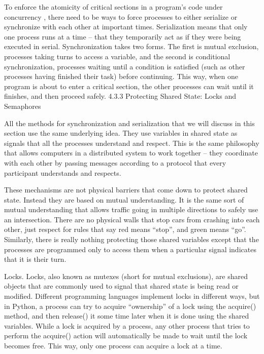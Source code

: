 \documentclass[letterpaper,10pt,dvipdfmx]{sphinxmanual}
\begin{document}
To enforce the atomicity of critical sections in a program's code under concurrency , there need to be ways to force processes to either serialize or synchronize with each other at important times. Serialization means that only one process runs at a time -- that they temporarily act as if they were being executed in serial. Synchronization takes two forms. The first is mutual exclusion, processes taking turns to access a variable, and the second is conditional synchronization, processes waiting until a condition is satisfied (such as other processes having finished their task) before continuing. This way, when one program is about to enter a critical section, the other processes can wait until it finishes, and then proceed safely.
4.3.3   Protecting Shared State: Locks and Semaphores

All the methods for synchronization and serialization that we will discuss in this section use the same underlying idea. They use variables in shared state as signals that all the processes understand and respect. This is the same philosophy that allows computers in a distributed system to work together -- they coordinate with each other by passing messages according to a protocol that every participant understands and respects.

These mechanisms are not physical barriers that come down to protect shared state. Instead they are based on mutual understanding. It is the same sort of mutual understanding that allows traffic going in multiple directions to safely use an intersection. There are no physical walls that stop cars from crashing into each other, just respect for rules that say red means ``stop'', and green means ``go''. Similarly, there is really nothing protecting those shared variables except that the processes are programmed only to access them when a particular signal indicates that it is their turn.

Locks. Locks, also known as mutexes (short for mutual exclusions), are shared objects that are commonly used to signal that shared state is being read or modified. Different programming languages implement locks in different ways, but in Python, a process can try to acquire ``ownership'' of a lock using the acquire() method, and then release() it some time later when it is done using the shared variables. While a lock is acquired by a process, any other process that tries to perform the acquire() action will automatically be made to wait until the lock becomes free. This way, only one process can acquire a lock at a time.
\end{document}
